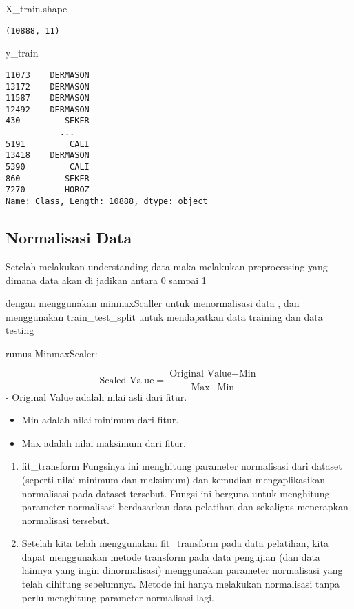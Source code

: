 \documentclass[
  letterpaper,
]{krantz}
\makeatletter
\newenvironment{Shaded}{\begin{snugshade}}{\end{snugshade}}
\newcommand{\NormalTok}[1]{\textcolor[rgb]{0.00,0.23,0.31}{#1}}
\newenvironment{kframe}{%
\medskip{}
\setlength{\fboxsep}{.8em}
 \def\at@end@of@kframe{}%
 \ifinner\ifhmode%
  \def\at@end@of@kframe{\end{minipage}}%
  \begin{minipage}{\columnwidth}%
 \fi\fi%
 \def\FrameCommand##1{\hskip\@totalleftmargin \hskip-\fboxsep
 \colorbox{shadecolor}{##1}\hskip-\fboxsep
     \hskip-\linewidth \hskip-\@totalleftmargin \hskip\columnwidth}%
 \MakeFramed {\advance\hsize-\width
   \@totalleftmargin\z@ \linewidth\hsize
   \@setminipage}}%
 {\par\unskip\endMakeFramed%
 \at@end@of@kframe}
\renewenvironment{Shaded}{\begin{kframe}}{\end{kframe}}
\makeatother
\begin{document}
\begin{Shaded}
\begin{Highlighting}[]
\NormalTok{X\_train.shape}
\end{Highlighting}
\end{Shaded}

\begin{verbatim}
(10888, 11)
\end{verbatim}

\begin{Shaded}
\begin{Highlighting}[]
\NormalTok{y\_train}
\end{Highlighting}
\end{Shaded}

\begin{verbatim}
11073    DERMASON
13172    DERMASON
11587    DERMASON
12492    DERMASON
430         SEKER
           ...   
5191         CALI
13418    DERMASON
5390         CALI
860         SEKER
7270        HOROZ
Name: Class, Length: 10888, dtype: object
\end{verbatim}

\hypertarget{normalisasi-data}{%
\subsection{Normalisasi Data}\label{normalisasi-data}}

Setelah melakukan understanding data maka melakukan preprocessing yang
dimana data akan di jadikan antara 0 sampai 1

dengan menggunakan minmaxScaller untuk menormalisasi data , dan
menggunakan train\_test\_split untuk mendapatkan data training dan data
testing

rumus MinmaxScaler:

\[
\text{Scaled Value} = \frac{\text{Original Value} - \text{Min}}{\text{Max} - \text{Min}}
\] - Original Value adalah nilai asli dari fitur.

\begin{itemize}
\item
  Min adalah nilai minimum dari fitur.
\item
  Max adalah nilai maksimum dari fitur.
\end{itemize}

\begin{enumerate}
\def\labelenumi{\arabic{enumi}.}
\item
  fit\_transform Fungsinya ini menghitung parameter normalisasi dari
  dataset (seperti nilai minimum dan maksimum) dan kemudian
  mengaplikasikan normalisasi pada dataset tersebut. Fungsi ini berguna
  untuk menghitung parameter normalisasi berdasarkan data pelatihan dan
  sekaligus menerapkan normalisasi tersebut.
\item
  Setelah kita telah menggunakan fit\_transform pada data pelatihan,
  kita dapat menggunakan metode transform pada data pengujian (dan data
  lainnya yang ingin dinormalisasi) menggunakan parameter normalisasi
  yang telah dihitung sebelumnya. Metode ini hanya melakukan normalisasi
  tanpa perlu menghitung parameter normalisasi lagi.
\end{enumerate}
\end{document}
